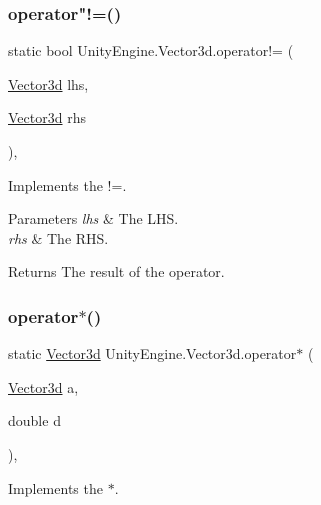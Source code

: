 \subsubsection{\texorpdfstring{operator"!=()}{operator!=()}}
{\footnotesize\ttfamily static bool Unity\+Engine.\+Vector3d.\+operator!= (\begin{DoxyParamCaption}\item[{\hyperlink{struct_unity_engine_1_1_vector3d}{Vector3d}}]{lhs,  }\item[{\hyperlink{struct_unity_engine_1_1_vector3d}{Vector3d}}]{rhs }\end{DoxyParamCaption})\hspace{0.3cm}{\ttfamily [inline]}, {\ttfamily [static]}}



Implements the !=. 


\begin{DoxyParams}{Parameters}
{\em lhs} & The L\+HS.\\
\hline
{\em rhs} & The R\+HS.\\
\hline
\end{DoxyParams}
\begin{DoxyReturn}{Returns}
The result of the operator.
\end{DoxyReturn}
\mbox{\label{struct_unity_engine_1_1_vector3d_aaa34740e2dc031ee004732b71a15e8c7}} 
\subsubsection{\texorpdfstring{operator$\ast$()}{operator*()}\hspace{0.1cm}{\footnotesize\ttfamily [1/2]}}
{\footnotesize\ttfamily static \hyperlink{struct_unity_engine_1_1_vector3d}{Vector3d} Unity\+Engine.\+Vector3d.\+operator$\ast$ (\begin{DoxyParamCaption}\item[{\hyperlink{struct_unity_engine_1_1_vector3d}{Vector3d}}]{a,  }\item[{double}]{d }\end{DoxyParamCaption})\hspace{0.3cm}{\ttfamily [inline]}, {\ttfamily [static]}}



Implements the $\ast$. 


